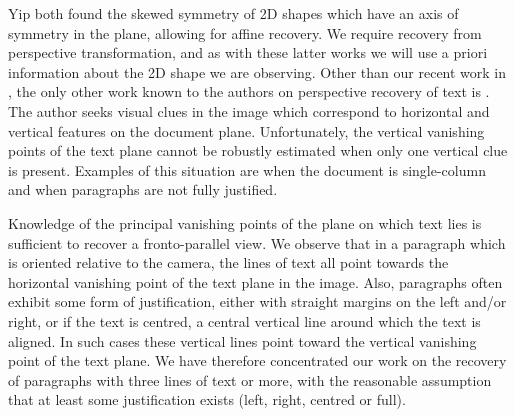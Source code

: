 \documentclass{article}
\begin{document}
Yip \cite{yip} both found the skewed symmetry of 2D shapes which have an axis of
symmetry in the plane, allowing for affine recovery.  We require recovery from
perspective transformation, and as with these latter works we will use a priori
information about the 2D shape we are observing.
Other than our recent work in \cite{clark-ijdar-2001}, the only other work known to the authors on perspective recovery of text is \cite{pilucvpr1}.  The author seeks visual clues in the image which correspond to horizontal and vertical features on the document plane.  Unfortunately, the vertical vanishing points of the text plane cannot be robustly estimated when only one vertical clue is present.  Examples of this situation are when the document is single-column and when paragraphs are not fully justified.

Knowledge of the principal vanishing points of the plane on which text lies is
sufficient to recover a fronto-parallel view.  We observe that in a paragraph
which is oriented relative to the camera, the lines of text all point towards
the horizontal vanishing point of the text plane in the image.  Also, paragraphs
often exhibit some form of justification, either with straight margins on the
left and/or right, or if the text is centred, a central vertical line around which
the text is aligned.  In such cases these vertical lines point toward the
vertical vanishing point of the text plane.  We have therefore concentrated our
work on the recovery of paragraphs with three lines of text or more, with 
the reasonable assumption that at least some justification exists (left, 
right, centred or full).
\end{document}
